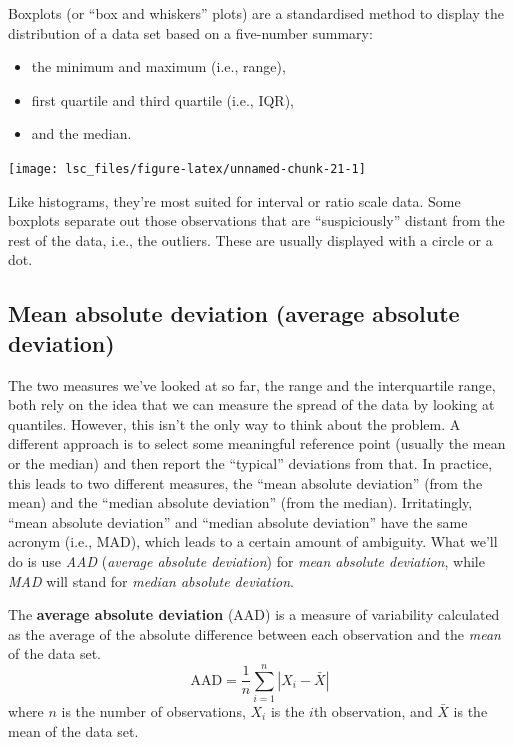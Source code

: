 \documentclass[
  11pt,
  a4paper,
  twoside,symmetric,openright]{book}
\providecommand{\tightlist}{%
  \setlength{\itemsep}{0pt}\setlength{\parskip}{0pt}}
\theoremstyle{break}
\theoremstyle{break}
\begin{document}
\label{boxplot}
\begin{callout}[Boxplots]

Boxplots (or ``box and whiskers'' plots) are a standardised method to display the distribution of a data set based on a five-number summary:

\begin{itemize}
\tightlist
\item
  the minimum and maximum (i.e., range),
\item
  first quartile and third quartile (i.e., IQR),
\item
  and the median.
\end{itemize}

\begin{center}\texttt{[image: lsc\_files/figure-latex/unnamed-chunk-21-1]} \end{center}

Like histograms, they're most suited for interval or ratio scale data. Some boxplots separate out those observations that are ``suspiciously'' distant from the rest of the data, i.e., the outliers. These are usually displayed with a circle or a dot.

\end{callout}

\subsection{Mean absolute deviation (average absolute deviation)}\label{aad}

The two measures we've looked at so far, the range and the interquartile range, both rely on the idea that we can measure the spread of the data by looking at quantiles. However, this isn't the only way to think about the problem. A different approach is to select some meaningful reference point (usually the mean or the median) and then report the ``typical'' deviations from that. In practice, this leads to two different measures, the ``mean absolute deviation'' (from the mean) and the ``median absolute deviation'' (from the median). Irritatingly, ``mean absolute deviation'' and ``median absolute deviation'' have the same acronym (i.e., MAD), which leads to a certain amount of ambiguity. What we'll do is use \emph{AAD} (\emph{average absolute deviation}) for \emph{mean absolute deviation}, while \emph{MAD} will stand for \emph{median absolute deviation}.

\begin{definition}
\protect\hypertarget{def:defAAD}{}\label{def:defAAD}The \textbf{average absolute deviation} (AAD) is a measure of variability calculated as the average of the absolute difference between each observation and the \emph{mean} of the data set.
\[
\text{AAD} = \frac{1}{n} \sum_{i=1}^n |X_i - \bar{X}|
\]
where \(n\) is the number of observations, \(X_i\) is the \(i\)th observation, and \(\bar{X}\) is the mean of the data set.
\end{definition}
\end{document}
